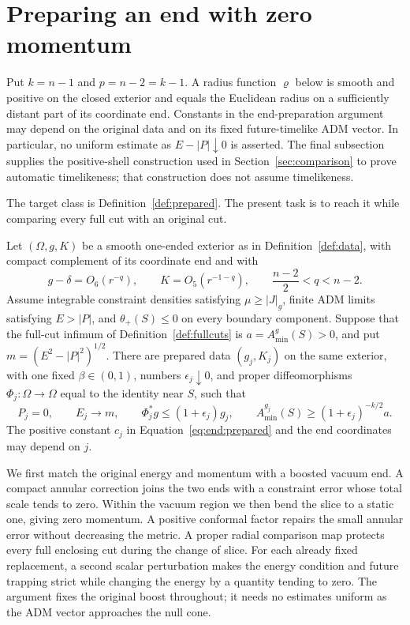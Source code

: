 \section{Preparing an end with zero momentum}\label{sec:end}

Put $k=n-1$ and $p=n-2=k-1$.  A radius function $\varrho$ below
is smooth and positive on the closed exterior and equals the Euclidean
radius on a sufficiently distant part of its coordinate end.  Constants
in the end-preparation argument may depend on the original data and on its fixed
future-timelike ADM vector.  In particular, no uniform estimate as
$E-|P|\downarrow0$ is asserted. The final subsection supplies the positive-shell
construction used in
Section~\ref{sec:comparison} to prove automatic timelikeness; that
construction does not assume timelikeness.

The target class is Definition~\ref{def:prepared}. The present
task is to reach it while comparing every full cut with an original cut.

\begin{proposition}
\label{prop:end:reduction}
Let $(\Omega,g,K)$ be a smooth one-ended exterior as in
Definition~\ref{def:data}, with compact complement of its coordinate
end and with
\[
 g-\delta=O_6(r^{-q}),\qquad K=O_5(r^{-1-q}),\qquad
 \frac{n-2}{2}<q<n-2.
\]
Assume integrable constraint densities satisfying $\mu\ge|J|_g$,
finite ADM limits satisfying $E>|P|$, and $\theta_+(S)\le0$ on every
boundary component.  Suppose that the full-cut infimum of
Definition~\ref{def:fullcuts} is $a=A_{\min}^{g}(S)>0$, and put
$m=(E^2-|P|^2)^{1/2}$.
There are prepared data $(g_j,K_j)$ on the same exterior, with one
fixed $\beta\in(0,1)$, numbers $\epsilon_j\downarrow0$, and proper
diffeomorphisms $\Phi_j:\Omega\longrightarrow\Omega$ equal to the
identity near $S$, such that
\begin{equation}\label{eq:end:reduction-limits}
 P_j=0,\qquad E_j\longrightarrow m,\qquad
 \Phi_j^*g\le(1+\epsilon_j)g_j,\qquad
 A_{\min}^{g_j}(S)\ge(1+\epsilon_j)^{-k/2}a.
\end{equation}
The positive constant $c_j$ in Equation~\eqref{eq:end:prepared} and
the end coordinates may depend on $j$.
\end{proposition}

We first match the original energy and momentum with a
boosted vacuum end.  A compact annular correction joins the two ends
with a constraint error whose total scale tends to zero.  Within the
vacuum region we then bend the slice to a static one, giving zero
momentum.  A positive conformal factor repairs the small annular
error without decreasing the metric.  A proper radial comparison
map protects every full enclosing cut during the change of slice.
For each already fixed replacement, a second scalar perturbation makes
the energy condition and future trapping strict while changing the energy
by a quantity tending to zero. The argument fixes the original boost
throughout; it needs
no estimates uniform as the ADM vector approaches the null cone.

